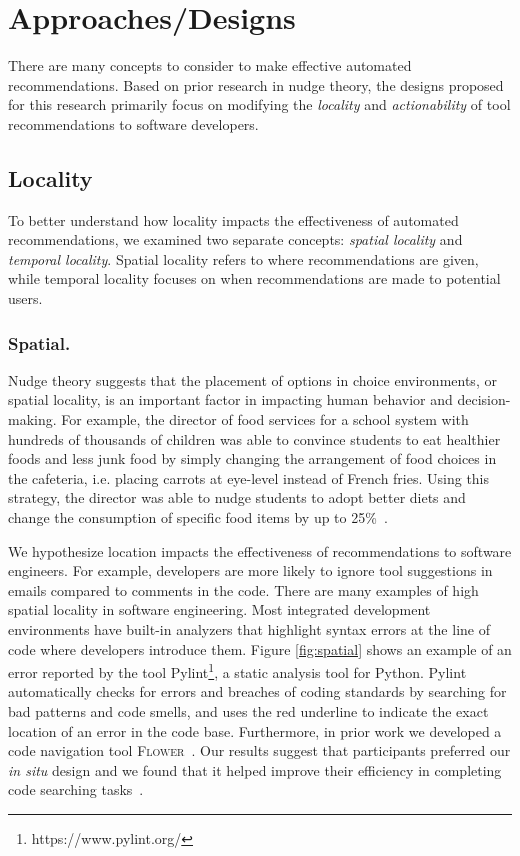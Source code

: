 \section{Approaches/Designs}

There are many concepts to consider to make effective automated recommendations. Based on prior research in nudge theory, the designs proposed for this research primarily focus on modifying the \textit{locality} and \textit{actionability} of tool recommendations to software developers.

\subsection{Locality}

To better understand how locality impacts the effectiveness of automated recommendations, we examined two separate concepts: \textit{spatial locality} and \textit{temporal locality}. Spatial locality refers to where recommendations are given, while temporal locality focuses on when recommendations are made to potential users.

\subsubsection{Spatial.}

Nudge theory suggests that the placement of options in choice environments, or spatial locality, is an important factor in impacting human behavior and decision-making. For example, the director of food services for a school system with hundreds of thousands of children was able to convince students to eat healthier foods and less junk food by simply changing the arrangement of food choices in the cafeteria, i.e. placing carrots at eye-level instead of French fries. Using this strategy, the director was able to nudge students to adopt better diets and change the consumption of specific food items by up to 25\%~\cite[p.~1]{sunstein2008nudge}. 

We hypothesize location impacts the effectiveness of recommendations to software engineers. For example, developers are more likely to ignore tool suggestions in emails compared to comments in the code. There are many examples of high spatial locality in software engineering. Most integrated development environments have built-in analyzers that highlight syntax errors at the line of code where developers introduce them. Figure \ref{fig:spatial} shows an example of an error reported by the tool  Pylint\footnote{https://www.pylint.org/}, a static analysis tool for Python. Pylint automatically checks for errors and breaches of coding standards by searching for bad patterns and code smells, and uses the red underline to indicate the exact location of an error in the code base. Furthermore, in prior work we developed a code navigation tool \textsc{Flower}~\cite{Flower}. Our results suggest that participants preferred our \textit{in situ} design and we found that it helped improve their efficiency in completing code searching tasks~\cite{Flower}.


